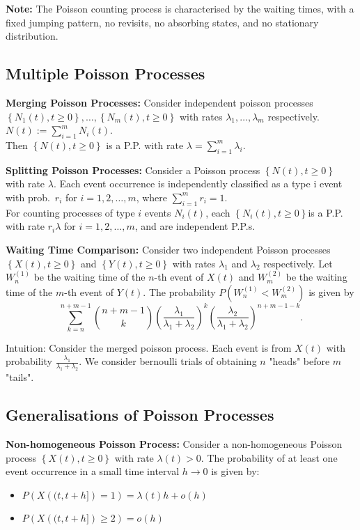 \textcolor{Bittersweet}{\textbf{Note:}} The Poisson counting process is characterised by
the waiting times, with a fixed jumping pattern, no revisits, no absorbing
states, and no stationary distribution. 

\subsection{Multiple Poisson Processes}
\textbf{Merging Poisson Processes:} Consider independent poisson processes
$\left\{ N_1\left( t \right) ,t\ge 0 \right\} , \ldots,\left\{ N_m\left( t
\right) ,t\ge 0 \right\} $ with rates $\lambda_1, \ldots,\lambda_m$
respectively. $N\left( t \right) :=\sum_{i=1}^{m} N_i\left( t \right)$.\\
Then $\left\{ N\left( t \right) ,t\ge 0 \right\} $ is a P.P. with rate
$\lambda=\sum_{i=1}^{m} \lambda_i$.

\textbf{Splitting Poisson Processes:} Consider a Poisson process $\left\{
N\left( t \right) ,t\ge 0 \right\} $ with rate $\lambda$. Each event occurrence
is independently classified as a type i event with prob.\ $r_i$ for
$i=1,2,\ldots,m$, where $\sum_{i=1}^{m} r_i=1$.\\
For counting processes of type $i$ events $N_i\left( t \right) $, each $\left\{
N_i\left( t \right) ,t\ge 0 \right\} $is a P.P. with rate $r_i\lambda$ for
$i=1,2,\ldots,m$, and are independent P.P.s.

\textbf{Waiting Time Comparison: } Consider two independent Poisson processes
$\left\{ X\left( t \right) ,t\ge 0 \right\} $ and $\left\{ Y\left( t \right)
,t\ge 0 \right\} $ with rates $\lambda_1$ and $\lambda_2$ respectively. Let
$W_{n}^{(1)}$ be the waiting time of the $n$-th event of $X\left( t \right) $
and $W_m^{(2)}$ be the waiting time of the $m$-th  event of $Y\left( t \right)
$. The probability $P\left( W_{n}^{(1)}<W_m^{(2)} \right)$ is
given by \[\sum_{k=n}^{n+m-1} \binom{n+m-1}{k}{\left(
\frac{\lambda_1}{\lambda_1+\lambda_2} \right)} ^{k}{\left(
\frac{\lambda_2}{\lambda_1+\lambda_2} \right)}^{n+m-1-k}.\] 

\textcolor{Bittersweet}{Intuition: }Consider the merged poisson process. Each
event is from $X\left( t \right) $ with probability
$\frac{\lambda_1}{\lambda_1+\lambda_2}$. We consider bernoulli trials of
obtaining $n$ "heads" before $m$ "tails".

\subsection{Generalisations of Poisson Processes}
\textbf{Non-homogeneous Poisson Process:} Consider a non-homogeneous Poisson process $\left\{ X\left( t \right) ,t\ge 0 \right\} $ with rate $\lambda\left( t \right) >0$. The probability of at least one event occurrence in a small time interval $h\rightarrow 0$ is given by:
\begin{itemize}
  \item $P\left( X\left( (t,t+h] \right) =1 \right) =\lambda\left( t \right) h+o\left( h \right) $
  \item $P\left( X\left( (t,t+h] \right) \ge 2 \right) =o\left( h \right) $
\end{itemize}

